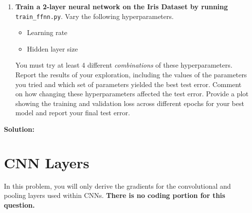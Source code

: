 \documentclass{article}
\newcommand{\Question}[1]{\Large \section{ #1 } \normalsize}
\newenvironment{solution}{\color{blue} \smallskip \textbf{Solution:}}{}
\begin{document}
\begin{enumerate}
    \item 
    \textbf{Train a 2-layer neural network on the Iris Dataset by running} \texttt{train\_ffnn.py}. 
    Vary the following hyperparameters.
    \begin{itemize}
        \item Learning rate
        \item Hidden layer size
    \end{itemize}
    You must try at least 4 different \textit{combinations} of these hyperparameters. 
    Report the results of your exploration, including the values of the parameters you tried and which set of parameters yielded the best test error. 
    Comment on how changing these hyperparameters affected the test error. 
    Provide a plot showing the training and validation loss across different epochs for your best model and report your final test error.
\end{enumerate}

\begin{solution}
   
\end{solution}

\newpage
\Question{CNN Layers}
In this problem, you will only derive the gradients for the convolutional and pooling layers used within CNNs. 
\textbf{There is no coding portion for this question.}
\end{document}
